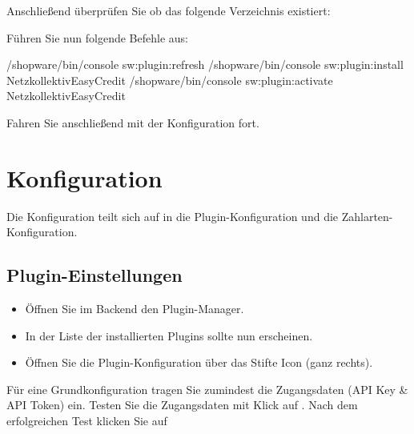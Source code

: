 \documentclass[a4paper,10pt,openany,oneside,ngerman]{sphinxmanual}
\begin{document}
Anschließend überprüfen Sie ob das folgende Verzeichnis existiert:
\begin{quote}

\end{quote}

Führen Sie nun folgende Befehle aus:

%
\begin{sphinxVerbatim}[commandchars=\\\{\}]
/shopware/bin/console sw:plugin:refresh
/shopware/bin/console sw:plugin:install NetzkollektivEasyCredit
/shopware/bin/console sw:plugin:activate NetzkollektivEasyCredit
\end{sphinxVerbatim}

Fahren Sie anschließend mit der Konfiguration fort.


\chapter{Konfiguration}
\label{\detokenize{configuration:konfiguration}}\label{\detokenize{configuration::doc}}
Die Konfiguration teilt sich auf in die Plugin-Konfiguration und die Zahlarten-Konfiguration.


\section{Plugin-Einstellungen}
\label{\detokenize{configuration:plugin-einstellungen}}
\begin{figure}[htbp]
\centering

\noindent{}
\end{figure}
\begin{itemize}
\item {} 
Öffnen Sie im Backend den Plugin-Manager. 

\item {} 
In der Liste der installierten Plugins sollte nun  erscheinen.

\item {} 
Öffnen Sie die Plugin-Konfiguration über das Stifte Icon (ganz rechts).

\end{itemize}

Für eine Grundkonfiguration tragen Sie zumindest die Zugangsdaten (API Key \& API Token) ein.
Testen Sie die Zugangsdaten mit Klick auf .
Nach dem erfolgreichen Test klicken Sie auf 
\end{document}
